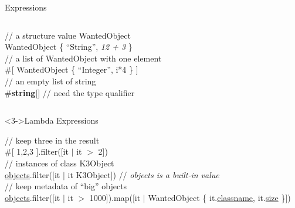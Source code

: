 \documentclass[10pt,xcolor={dvipsnames}]{beamer}
\begin{document}
\begin{frame}{Expressions}
\begin{columns}
\begin{exampleblock}
\begin{footnotesize}
					\hspace{.1cm} \textcolor{Emerald}{// a structure value WantedObject} \\
					\hspace{.1cm}  WantedObject \{ \textcolor{NavyBlue}{``String''}, \textit{12 + 3} \} \\
					\hspace{.1cm} \textcolor{Emerald}{// a list of WantedObject with one element} \\
					\hspace{.1cm} \#[  WantedObject \{ \textcolor{NavyBlue}{``Integer''}, i*4 \} ]\\ %
					\hspace{.1cm} \textcolor{Emerald}{// an empty list of string} \\
					\hspace{.1cm} \#\textbf{string}[] \textcolor{Emerald}{// need the type qualifier } \\
				\end{footnotesize}
			\end{exampleblock}
		\end{columns}
		\vspace{0.3cm}
		\begin{columns}
			\centering
			\begin{exampleblock}<3->{Lambda Expressions}
				\begin{footnotesize}
					\hspace{.1cm} \textcolor{NavyBlue}{// keep three in the result} \\
					\hspace{.1cm} \#[ 1,2,3 ].filter([it $|$ it $>$ 2])
					\hspace{.1cm} {}\\
					\hspace{.1cm} \textcolor{NavyBlue}{// instances of class K3Object} \\
					\hspace{.1cm} \underline{objects}.filter([it $|$ it  K3Object]) \textcolor{NavyBlue}{// \textit{objects is a built-in value}}\\
					\hspace{.1cm} \textcolor{NavyBlue}{// keep metadata of ``big'' objects } \\
					\hspace{.1cm} \underline{objects}.filter([it $|$ it $>$ 1000]).map([it $|$  WantedObject \{ it.\underline{classname}, it.\underline{size} \}]) \\
				\end{footnotesize}
			\end{exampleblock}
		\end{columns}
	\end{frame}
	
\end{document}
